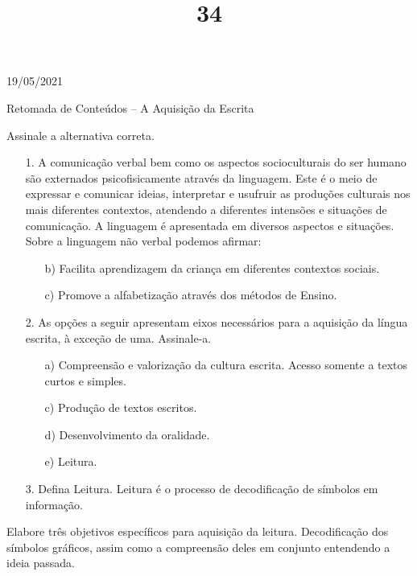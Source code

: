 \documentclass{SchoolBook}
\begin{document}
    \begin{day}{19/05/2021}
        \title{3}{Retomada de Conteúdos -- A Aquisição da Escrita}
        \title{4}{Assinale a alternativa correta.}
        
        \begin{enumerate}
            \item[1.] A comunicação verbal bem como os aspectos socioculturais do ser humano são externados psicofisicamente através da linguagem. Este é o meio de expressar e comunicar ideias, interpretar e usufruir as produções culturais nos mais diferentes contextos, atendendo a diferentes intensões e situações de comunicação. A linguagem é apresentada em diversos aspectos e situações. Sobre a linguagem não verbal podemos afirmar:
            \begin{enumerate}[nosep]
                \itemc[a)] Promove a comunicação de ideias, utilizando símbolos gráficos, imagens e, não necessariamente letras.
                \item[b)] Facilita aprendizagem da criança em diferentes contextos sociais.
                \item[c)] Promove a alfabetização através dos métodos de Ensino.
            \end{enumerate}
            
            \item[2.] As opções a seguir apresentam eixos necessários para a aquisição da língua escrita, à exceção de uma. Assinale-a.
            \begin{enumerate}[nosep]
                \item[a)] Compreensão e valorização da cultura escrita.
                \itemc[b)] Acesso somente a textos curtos e simples.
                \item[c)] Produção de textos escritos.
                \item[d)] Desenvolvimento da oralidade.
                \item[e)] Leitura.
            \end{enumerate}
            
            \item[3.] Defina Leitura.
            \response Leitura é o processo de decodificação de símbolos em informação.
        \end{enumerate}
        
        Elabore três objetivos específicos para aquisição da leitura.
        \response Decodificação dos símbolos gráficos, assim como a compreensão deles em conjunto entendendo a ideia passada.
    \end{day}
    
\end{document}
